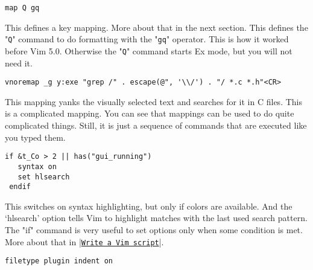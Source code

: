  \begin{Verbatim}[samepage=true]
 map Q gq
 \end{Verbatim}

This defines a key mapping.
More about that in the next section.
This defines the "\verb!Q!" command to do formatting with the "\verb!gq!" operator.
This is how it worked before Vim 5.0.
Otherwise the "\verb!Q!" command starts Ex mode, but you will not need it.

 \begin{Verbatim}[samepage=true]
 vnoremap _g y:exe "grep /" . escape(@", '\\/') . "/ *.c *.h"<CR>
 \end{Verbatim}

This mapping yanks the visually selected text and searches for it in C files.
This is a complicated mapping.
You can see that mappings can be used to do quite complicated things.
Still, it is just a sequence of commands that are executed like you typed them.

 \begin{Verbatim}[samepage=true]
 if &t_Co > 2 || has("gui_running")
   syntax on
   set hlsearch
 endif
 \end{Verbatim}

This switches on syntax highlighting, but only if colors are available.
And the `hlsearch' option tells Vim to highlight matches with the last used search pattern.
The "if" command is very useful to set options only when some condition is met.
More about that in |\hyperref[Write a Vim script]{\texttt{Write a Vim script}}|.
\label{vimrc-filetype}
 \begin{Verbatim}[samepage=true]
 filetype plugin indent on
 \end{Verbatim}

